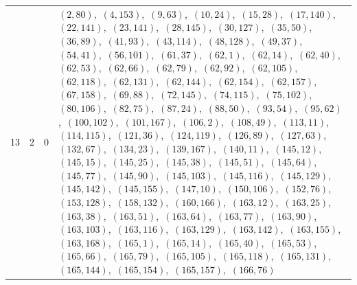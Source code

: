 \documentclass[11pt]{article}
\begin{document}
\begin{longtable}{@{}rrl>{\raggedright\arraybackslash}p{}@{}}
13 & 2 & $0$ & $(2,80)$,\allowbreak\ $(4,153)$,\allowbreak\ $(9,63)$,\allowbreak\ $(10,24)$,\allowbreak\ $(15,28)$,\allowbreak\ $(17,140)$,\allowbreak\ $(22,141)$,\allowbreak\ $(23,141)$,\allowbreak\ $(28,145)$,\allowbreak\ $(30,127)$,\allowbreak\ $(35,50)$,\allowbreak\ $(36,89)$,\allowbreak\ $(41,93)$,\allowbreak\ $(43,114)$,\allowbreak\ $(48,128)$,\allowbreak\ $(49,37)$,\allowbreak\ $(54,41)$,\allowbreak\ $(56,101)$,\allowbreak\ $(61,37)$,\allowbreak\ $(62,1)$,\allowbreak\ $(62,14)$,\allowbreak\ $(62,40)$,\allowbreak\ $(62,53)$,\allowbreak\ $(62,66)$,\allowbreak\ $(62,79)$,\allowbreak\ $(62,92)$,\allowbreak\ $(62,105)$,\allowbreak\ $(62,118)$,\allowbreak\ $(62,131)$,\allowbreak\ $(62,144)$,\allowbreak\ $(62,154)$,\allowbreak\ $(62,157)$,\allowbreak\ $(67,158)$,\allowbreak\ $(69,88)$,\allowbreak\ $(72,145)$,\allowbreak\ $(74,115)$,\allowbreak\ $(75,102)$,\allowbreak\ $(80,106)$,\allowbreak\ $(82,75)$,\allowbreak\ $(87,24)$,\allowbreak\ $(88,50)$,\allowbreak\ $(93,54)$,\allowbreak\ $(95,62)$,\allowbreak\ $(100,102)$,\allowbreak\ $(101,167)$,\allowbreak\ $(106,2)$,\allowbreak\ $(108,49)$,\allowbreak\ $(113,11)$,\allowbreak\ $(114,115)$,\allowbreak\ $(121,36)$,\allowbreak\ $(124,119)$,\allowbreak\ $(126,89)$,\allowbreak\ $(127,63)$,\allowbreak\ $(132,67)$,\allowbreak\ $(134,23)$,\allowbreak\ $(139,167)$,\allowbreak\ $(140,11)$,\allowbreak\ $(145,12)$,\allowbreak\ $(145,15)$,\allowbreak\ $(145,25)$,\allowbreak\ $(145,38)$,\allowbreak\ $(145,51)$,\allowbreak\ $(145,64)$,\allowbreak\ $(145,77)$,\allowbreak\ $(145,90)$,\allowbreak\ $(145,103)$,\allowbreak\ $(145,116)$,\allowbreak\ $(145,129)$,\allowbreak\ $(145,142)$,\allowbreak\ $(145,155)$,\allowbreak\ $(147,10)$,\allowbreak\ $(150,106)$,\allowbreak\ $(152,76)$,\allowbreak\ $(153,128)$,\allowbreak\ $(158,132)$,\allowbreak\ $(160,166)$,\allowbreak\ $(163,12)$,\allowbreak\ $(163,25)$,\allowbreak\ $(163,38)$,\allowbreak\ $(163,51)$,\allowbreak\ $(163,64)$,\allowbreak\ $(163,77)$,\allowbreak\ $(163,90)$,\allowbreak\ $(163,103)$,\allowbreak\ $(163,116)$,\allowbreak\ $(163,129)$,\allowbreak\ $(163,142)$,\allowbreak\ $(163,155)$,\allowbreak\ $(163,168)$,\allowbreak\ $(165,1)$,\allowbreak\ $(165,14)$,\allowbreak\ $(165,40)$,\allowbreak\ $(165,53)$,\allowbreak\ $(165,66)$,\allowbreak\ $(165,79)$,\allowbreak\ $(165,105)$,\allowbreak\ $(165,118)$,\allowbreak\ $(165,131)$,\allowbreak\ $(165,144)$,\allowbreak\ $(165,154)$,\allowbreak\ $(165,157)$,\allowbreak\ $(166,76)$\\

\end{longtable}
\end{document}
